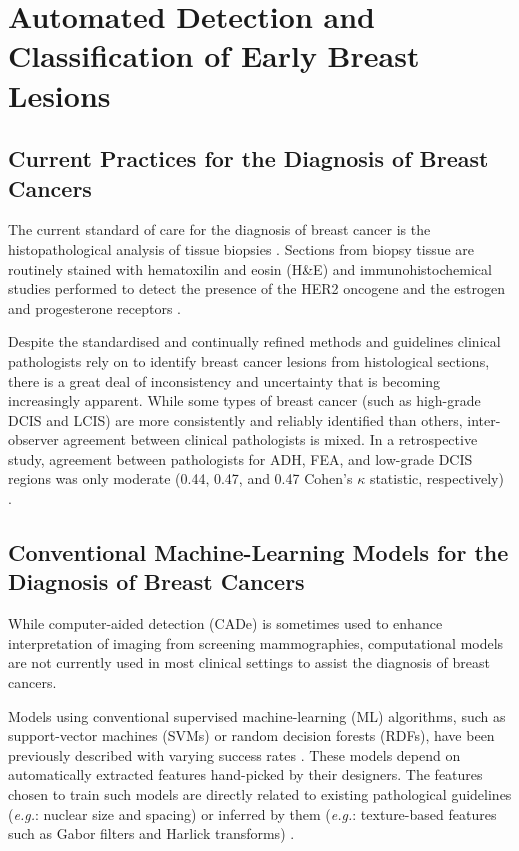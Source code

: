 \section{Automated Detection and Classification of Early Breast Lesions}

\subsection{Current Practices for the Diagnosis of Breast Cancers}

The current standard of care for the diagnosis of breast cancer is the histopathological analysis of tissue biopsies \citep{nccn}. Sections from biopsy tissue are routinely stained with hematoxilin and eosin (H\&E) and immunohistochemical studies performed to detect the presence of the HER2 oncogene and the estrogen and progesterone receptors \citep{who_intro}.\par

Despite the standardised and continually refined methods and guidelines clinical pathologists rely on to identify breast cancer lesions from histological sections, there is a great deal of inconsistency and uncertainty that is becoming increasingly apparent. While some types of breast cancer (such as high-grade DCIS and LCIS) are more consistently and reliably identified than others, inter-observer agreement between clinical pathologists is mixed. In a retrospective study, agreement between pathologists for ADH, FEA, and low-grade DCIS regions was only moderate (0.44, 0.47, and 0.47 Cohen's $\kappa$ statistic, respectively) \citep{gomes2014}.\par

\subsection{Conventional Machine-Learning Models for the Diagnosis of Breast Cancers}

While computer-aided detection (CADe) is sometimes used to enhance interpretation of imaging from screening mammographies, computational models are not currently used in most clinical settings to assist the diagnosis of breast cancers.\par

Models using conventional supervised machine-learning (ML) algorithms, such as support-vector machines (SVMs) or random decision forests (RDFs), have been previously described with varying success rates \citep{anuranjeeta2017, gertych2015}. These models depend on automatically extracted features hand-picked by their designers. The features chosen to train such models are directly related to existing pathological guidelines (\emph{e.g.}: nuclear size and spacing) or inferred by them (\emph{e.g.}: texture-based features such as Gabor filters and Harlick transforms) \citep{anuranjeeta2017, doyle2008}.\par

